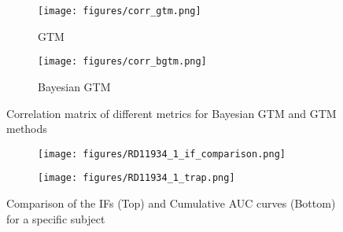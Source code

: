 \begin{figure}[h]
	\centering
	\begin{subfigure}{0.45\textwidth}
		\texttt{[image: figures/corr\_gtm.png]}
		\caption{GTM}
		\label{subfig:corr_gtm}
	\end{subfigure}
	\begin{subfigure}{0.45\textwidth}
		\texttt{[image: figures/corr\_bgtm.png]}
		\caption{Bayesian GTM}
		\label{subfig:corr_bgtm}
	\end{subfigure}
	\label{fig:corr_mat}
	\caption{Correlation matrix of different metrics for Bayesian GTM and GTM methods}
\end{figure}

\begin{figure}
	\centering
	\begin{subfigure}{\textwidth}
		\texttt{[image: figures/RD11934\_1\_if\_comparison.png]}
		\label{subfig:if_compare}
	\end{subfigure}
	\begin{subfigure}{\textwidth}
		\texttt{[image: figures/RD11934\_1\_trap.png]}
		\label{subfig:trap_compare}
	\end{subfigure}
	\label{fig:ifs}
	\caption{Comparison of the IFs (Top) and Cumulative AUC curves (Bottom) for a specific subject}
\end{figure}



